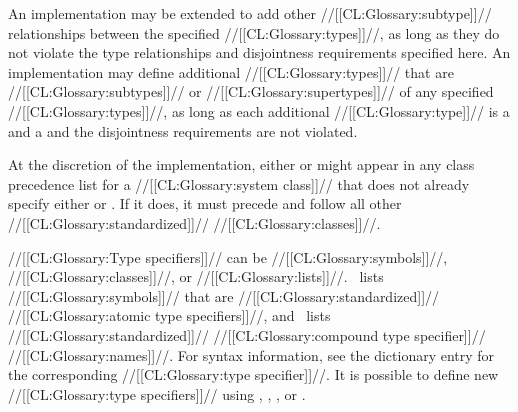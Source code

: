 \itemitem{\bull} 
An implementation may be extended to add other //[[CL:Glossary:subtype]]//
relationships between the specified //[[CL:Glossary:types]]//, as long as they do
not violate the type relationships and disjointness requirements
specified here.  An implementation may define additional //[[CL:Glossary:types]]//
that are //[[CL:Glossary:subtypes]]// or //[[CL:Glossary:supertypes]]// of any
specified //[[CL:Glossary:types]]//, as long as each additional //[[CL:Glossary:type]]// is
a  and a  and the disjointness requirements
are not violated.
 
At the discretion of the implementation, either 
or  might appear in any class precedence list
for a //[[CL:Glossary:system class]]// that does not already specify either 
 or .  If it does,
it must precede  and follow all other //[[CL:Glossary:standardized]]// //[[CL:Glossary:classes]]//.


\endlist                                     

\endsubSection%








//[[CL:Glossary:Type specifiers]]// can be //[[CL:Glossary:symbols]]//, //[[CL:Glossary:classes]]//, or //[[CL:Glossary:lists]]//.
\figref\StandardizedAtomicTypeSpecs\ lists //[[CL:Glossary:symbols]]// that are
  //[[CL:Glossary:standardized]]// //[[CL:Glossary:atomic type specifiers]]//, and
\figref\StandardizedCompoundTypeSpecNames\ lists
 //[[CL:Glossary:standardized]]// //[[CL:Glossary:compound type specifier]]// //[[CL:Glossary:names]]//.
For syntax information, see the dictionary entry for the corresponding //[[CL:Glossary:type specifier]]//.
It is possible to define new //[[CL:Glossary:type specifiers]]// using
 ,
 ,
 , 
or
 .



